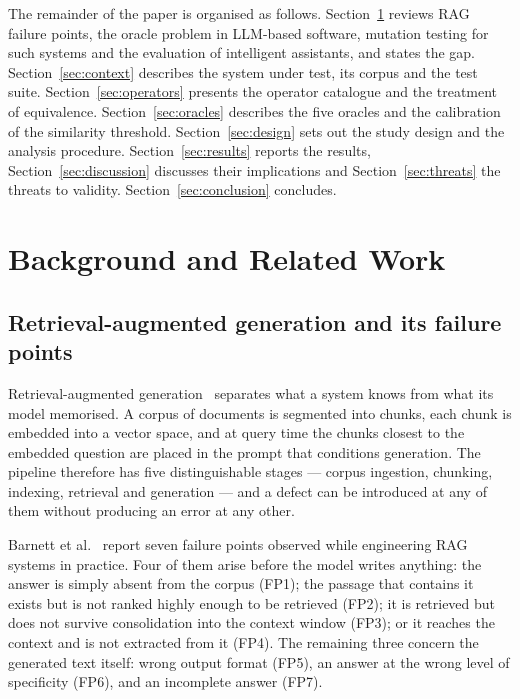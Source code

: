 \documentclass[a4paper,fleqn]{cas-dc}
\begin{document}
The remainder of the paper is organised as follows.
Section~\ref{sec:background} reviews RAG failure points, the oracle problem in
LLM-based software, mutation testing for such systems and the evaluation of
intelligent assistants, and states the gap. Section~\ref{sec:context} describes
the system under test, its corpus and the test suite.
Section~\ref{sec:operators} presents the operator catalogue and the treatment of
equivalence. Section~\ref{sec:oracles} describes the five oracles and the
calibration of the similarity threshold. Section~\ref{sec:design} sets out the
study design and the analysis procedure. Section~\ref{sec:results} reports the
results, Section~\ref{sec:discussion} discusses their implications and
Section~\ref{sec:threats} the threats to validity.
Section~\ref{sec:conclusion} concludes.

\section{Background and Related Work}
\label{sec:background}

\subsection{Retrieval-augmented generation and its failure points}
\label{sec:rag}

Retrieval-augmented generation~\cite{lewis2020rag} separates what a system
knows from what its model memorised. A corpus of documents is segmented into
chunks, each chunk is embedded into a vector space, and at query time the
chunks closest to the embedded question are placed in the prompt that
conditions generation. The pipeline therefore has five distinguishable stages
--- corpus ingestion, chunking, indexing, retrieval and generation --- and a
defect can be introduced at any of them without producing an error at any
other.

Barnett et al.~\cite{barnett2024seven} report seven failure points observed
while engineering RAG systems in practice. Four of them arise before the model
writes anything: the answer is simply absent from the corpus (FP1); the passage
that contains it exists but is not ranked highly enough to be retrieved (FP2);
it is retrieved but does not survive consolidation into the context window
(FP3); or it reaches the context and is not extracted from it (FP4). The
remaining three concern the generated text itself: wrong output format (FP5),
an answer at the wrong level of specificity (FP6), and an incomplete answer
(FP7).
\end{document}
